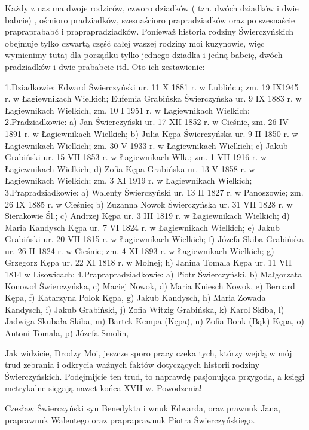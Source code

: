 Każdy z nas ma dwoje rodziców, czworo dziadków ( tzn. dwóch dziadków i dwie babcie) , ośmioro pradziadków, szesnaścioro prapradziadków oraz  po szesnaście prapraprababć  i praprapradziadków. Ponieważ historia rodziny Świerczyńskich obejmuje tylko czwartą część całej waszej  rodziny moi  kuzynowie, więc wymienimy tutaj dla porządku tylko jednego dziadka i jedną babcię, dwóch pradziadków i dwie prababcie itd. Oto ich zestawienie:


1.Dziadkowie: 
  Edward Świerczyński ur. 11 X 1881 r. w Lublińcu; zm. 19 IX1945 r. w Łagiewnikach Wielkich;
  Eufemia Grabińska Świerczyńska ur. 9 IX 1883 r. w Łagiewnikach Wielkich, zm. 10 I 1951 r. w Łagiewnikach Wielkich;
2.Pradziadkowie:
  a) Jan Świerczyński ur. 17 XII 1852 r. w Cieśnie, zm. 26 IV 1891 r. w Łagiewnikach Wielkich;
  b) Julia Kępa Świerczyńska ur. 9 II 1850 r. w Łagiewnikach Wielkich; zm. 30 V 1933 r. w Łagiewnikach Wielkich;
  c) Jakub Grabiński ur. 15 VII 1853 r. w Łagiewnikach Wlk.; zm. 1 VII 1916 r. w Łagiewnikach Wielkich;          
  d) Zofia Kępa Grabińska ur. 13 V 1858 r. w Łagiewnikach Wielkich; zm. 3 XI 1919 r. w Łagiewnikach Wielkich;
3.Prapradziadkowie:
a) Walenty Świerczyński ur. 13 II 1827 r. w Panoszowie; zm. 26 IX 1885 r. w Cieśnie;
b) Zuzanna Nowok Świerczyńska ur. 31 VII 1828 r. w Sierakowie Śl.;
c) Andrzej Kępa ur. 3 III 1819 r. w Łagiewnikach Wielkich;
d) Maria Kandysch Kępa ur. 7 VI 1824 r. w Łagiewnikach Wielkich;
e) Jakub Grabiński ur. 20 VII 1815 r. w Łagiewnikach Wielkich;
f) Józefa Skiba Grabińska ur. 26 II 1824 r. w Cieśnie; zm. 4 XI 1893 r. w Łagiewnikach Wielkich;
g) Grzegorz Kępa ur. 22 XI 1818 r. w Molnej;
h) Janina Tomala Kępa ur. 11 VII 1814 w Lisowicach;
4.Praprapradziadkowie:
a) Piotr Świerczyński,
b) Małgorzata Konowoł Świerczyńska,
c) Maciej Nowok,
d) Maria Kniesch Nowok,
e) Bernard Kępa, 
f)  Katarzyna Polok Kępa,
g) Jakub Kandysch,
h) Maria Zowada Kandysch,
i) Jakub Grabiński,
j) Zofia Witzig Grabińska,
k) Karol Skiba,
l) Jadwiga Skubała Skiba,
m) Bartek Kempa (Kępa),
n) Zofia Bonk (Bąk) Kępa,
o) Antoni Tomala,
p) Józefa Smolin,

Jak widzicie, Drodzy Moi, jeszcze sporo pracy czeka tych, którzy wejdą w mój trud zebrania i odkrycia ważnych faktów dotyczących historii rodziny Świerczyńskich. Podejmijcie ten trud, to naprawdę pasjonująca przygoda, a księgi metrykalne sięgają nawet końca XVII w.  Powodzenia! 

\begin{flushright}
Czesław Świerczyński
syn Benedykta i wnuk Edwarda, oraz prawnuk Jana, 
praprawnuk Walentego oraz prapraprawnuk Piotra Świerczyńskiego.
\end{flushright}














